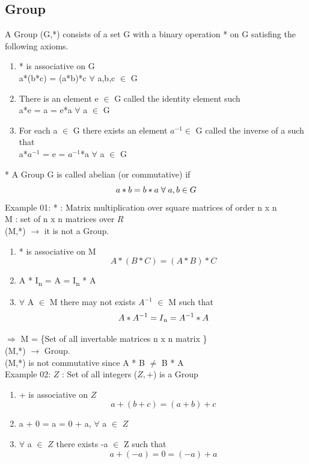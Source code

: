\documentclass[11pt]{article}
\begin{document}
	\subsection{Group}
	A Group (G,*) consists of a set G with a binary operation * on G satisfing the following axioms.
	\begin{enumerate}
		\item * is associative on G\\a*(b*c) = (a*b)*c $\forall$ a,b,c $\in$ G
		\item There is an element e $\in$ G called the identity element such \\a*e = a = e*a $\forall$ a $\in$ G
		\item For each a $\in$ G there exists an element $a^{-1} \in $ G called the inverse of a such that\\
		a*$a^{-1}$ = e = $a^{-1}$*a $\forall$ a $\in$ G
	\end{enumerate}
	\mbox{*} A Group G is called abelian (or commutative) if $$a*b = b*a \hspace{0.1cm}\forall\hspace{0.1cm}  a,b \in G$$
	Example 01: * : Matrix multiplication over square matrices of order n x n\\
	M : set of n x n matrices over $R$\\
	(M,*) $\rightarrow$ it is not a Group.\\
	\begin{enumerate}
		\item * is associative on M $$A*(B*C) = (A*B)*C$$
		\item A * I\textsubscript{n} = A = I\textsubscript{n} * A
		\item $\forall$ A $\in$ M there may not exists $A^{-1}$ $\in$ M such that $$A * A^{-1} = I\textsubscript{n} = A^{-1} * A$$  
	\end{enumerate}
	$\Rightarrow$ M = \{Set of all invertable matrices n x n matrix \}\\
	(M,*) $\rightarrow$ Group. \\
	(M,*) is not commutative since A * B $\neq$ B * A\vspace{0.2cm}\\
	Example 02: $Z$ : Set of all integers ($Z,+$) is a Group\\ 
	\begin{enumerate}
		\item + is associative on $Z$ $$a+(b+c) = (a+b)+c$$
		\item a + 0 = a = 0 + a, $\forall$ a $\in$ $Z$
		\item $\forall$ a $\in$ $Z$ there exists -a $\in$ Z such that $$a + (-a) = 0 = (-a) + a $$  
	\end{enumerate}
\end{document}
